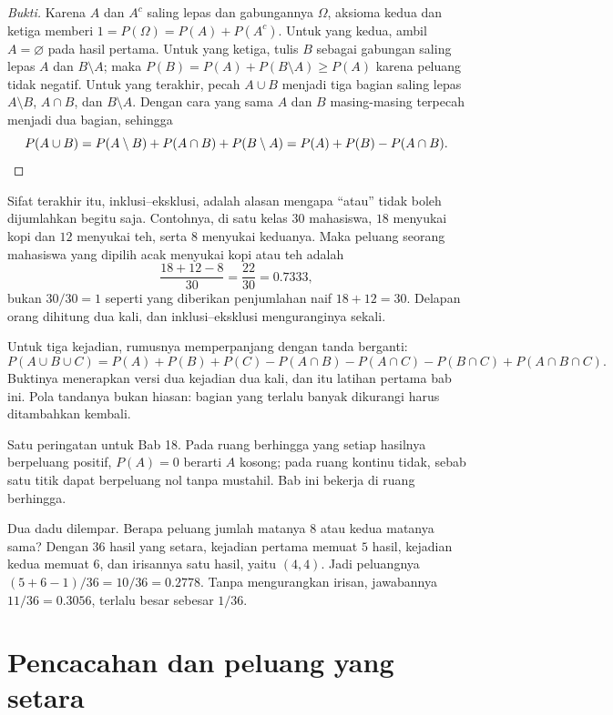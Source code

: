 \begin{proof}[Bukti]
Karena $A$ dan $A^{c}$ saling lepas dan gabungannya $\Omega$, aksioma kedua dan ketiga
memberi $1=P(\Omega)=P(A)+P(A^{c})$. Untuk yang kedua, ambil $A=\varnothing$ pada hasil
pertama. Untuk yang ketiga, tulis $B$ sebagai gabungan saling lepas $A$ dan
$B\setminus A$; maka $P(B)=P(A)+P(B\setminus A)\ge P(A)$ karena peluang tidak negatif.
Untuk yang terakhir, pecah $A\cup B$ menjadi tiga bagian saling lepas $A\setminus B$,
$A\cap B$, dan $B\setminus A$. Dengan cara yang sama $A$ dan $B$ masing-masing terpecah
menjadi dua bagian, sehingga
\[
P(A\cup B)=P(A\setminus B)+P(A\cap B)+P(B\setminus A)
=P(A)+P(B)-P(A\cap B).\qedhere
\]
\end{proof}

Sifat terakhir itu, inklusi--eksklusi, adalah alasan mengapa ``atau'' tidak boleh
dijumlahkan begitu saja. Contohnya, di satu kelas $30$ mahasiswa, $18$ menyukai kopi
dan $12$ menyukai teh, serta $8$ menyukai keduanya. Maka peluang seorang mahasiswa yang
dipilih acak menyukai kopi atau teh adalah
\[
\frac{18+12-8}{30}=\frac{22}{30}=0.7333,
\]
bukan $30/30=1$ seperti yang diberikan penjumlahan naif $18+12=30$. Delapan orang
dihitung dua kali, dan inklusi--eksklusi menguranginya sekali.

Untuk tiga kejadian, rumusnya memperpanjang dengan tanda berganti:
\[
P(A\cup B\cup C)=P(A)+P(B)+P(C)-P(A\cap B)-P(A\cap C)-P(B\cap C)+P(A\cap B\cap C).
\]
Buktinya menerapkan versi dua kejadian dua kali, dan itu latihan pertama bab ini. Pola
tandanya bukan hiasan: bagian yang terlalu banyak dikurangi harus ditambahkan kembali.

Satu peringatan untuk Bab 18. Pada ruang berhingga yang setiap hasilnya berpeluang
positif, $P(A)=0$ berarti $A$ kosong; pada ruang kontinu tidak, sebab satu titik dapat
berpeluang nol tanpa mustahil. Bab ini bekerja di ruang berhingga.

\begin{contoh}
Dua dadu dilempar. Berapa peluang jumlah matanya $8$ atau kedua matanya sama? Dengan
$36$ hasil yang setara, kejadian pertama memuat $5$ hasil, kejadian kedua memuat $6$,
dan irisannya satu hasil, yaitu $(4,4)$. Jadi peluangnya
$(5+6-1)/36=10/36=0.2778$. Tanpa mengurangkan irisan, jawabannya $11/36=0.3056$, terlalu
besar sebesar $1/36$.
\end{contoh}

\section{Pencacahan dan peluang yang setara}

